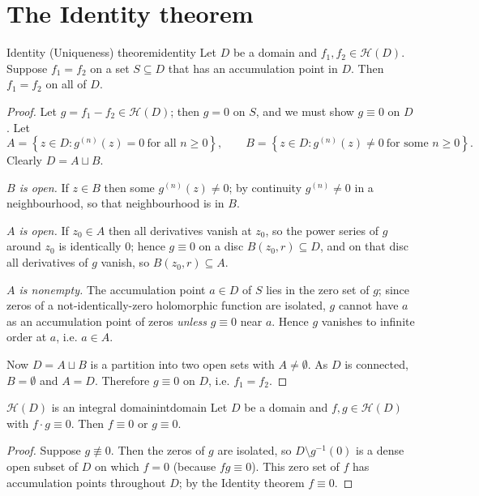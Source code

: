 \documentclass[11pt,openany]{report}
\newcommand{\set}[1]{\left\{ #1 \right\}}
\newcommand{\Hol}{\mathcal{H}}
\begin{document}
\section{The Identity theorem}

\begin{theorem}{Identity (Uniqueness) theorem}{identity}
Let $D$ be a domain and $f_1,f_2\in\Hol(D)$. Suppose $f_1=f_2$ on a set $S\subseteq D$ that
has an accumulation point in $D$. Then $f_1=f_2$ on all of $D$.
\end{theorem}

\begin{proof}
Let $g=f_1-f_2\in\Hol(D)$; then $g=0$ on $S$, and we must show $g\equiv0$ on $D$. Let
\[
  A = \set{ z\in D : g^{(n)}(z)=0 \ \text{for all } n\ge0 }, \qquad
  B = \set{ z\in D : g^{(n)}(z)\ne0 \ \text{for some } n\ge0 }.
\]
Clearly $D=A\sqcup B$.

\emph{$B$ is open.} If $z\in B$ then some $g^{(n)}(z)\ne0$; by continuity $g^{(n)}\ne0$ in a
neighbourhood, so that neighbourhood is in $B$.

\emph{$A$ is open.} If $z_0\in A$ then all derivatives vanish at $z_0$, so the power series
of $g$ around $z_0$ is identically $0$; hence $g\equiv0$ on a disc $B(z_0,r)\subseteq D$,
and on that disc all derivatives of $g$ vanish, so $B(z_0,r)\subseteq A$.

\emph{$A$ is nonempty.} The accumulation point $a\in D$ of $S$ lies in the zero set of $g$;
since zeros of a not-identically-zero holomorphic function are isolated, $g$ cannot have
$a$ as an accumulation point of zeros \emph{unless} $g\equiv0$ near $a$. Hence $g$ vanishes
to infinite order at $a$, i.e. $a\in A$.

Now $D=A\sqcup B$ is a partition into two open sets with $A\ne\emptyset$. As $D$ is
connected, $B=\emptyset$ and $A=D$. Therefore $g\equiv0$ on $D$, i.e. $f_1=f_2$.
\end{proof}

\begin{corollary}{$\Hol(D)$ is an integral domain}{intdomain}
Let $D$ be a domain and $f,g\in\Hol(D)$ with $f\cdot g\equiv0$. Then $f\equiv0$ or
$g\equiv0$.
\end{corollary}

\begin{proof}
Suppose $g\not\equiv0$. Then the zeros of $g$ are isolated, so $D\setminus g^{-1}(0)$ is a
dense open subset of $D$ on which $f=0$ (because $fg\equiv0$). This zero set of $f$ has
accumulation points throughout $D$; by the Identity theorem $f\equiv0$.
\end{proof}
\end{document}
